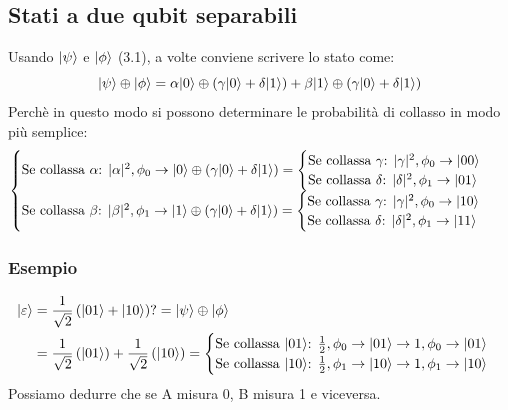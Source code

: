 \documentclass[12pt, a4paper]{report}
\begin{document}
\subsection{Stati a due qubit separabili}
Usando $| \psi \rangle$ e $| \phi \rangle$ (3.1), a volte conviene scrivere lo stato come:
\begin{equation*}
    | \psi \rangle\oplus| \phi \rangle = \alpha| 0 \rangle \oplus \left(\gamma| 0 \rangle+\delta| 1 \rangle\right) + \beta| 1 \rangle \oplus \left(\gamma| 0 \rangle+\delta| 1 \rangle\right)
\end{equation*}
Perchè in questo modo si possono determinare le probabilità di collasso in modo più semplice:
\begin{equation*}
    \begin{cases}
        \text{Se collassa $\alpha$: } |\alpha|^{2},\phi_{0} \rightarrow | 0 \rangle\oplus\left(\gamma| 0 \rangle+\delta| 1 \rangle\right) = \begin{cases}
            \text{Se collassa $\gamma$: } |\gamma|^{2},\phi_{0}\rightarrow | 00 \rangle\\
            \text{Se collassa $\delta$: } |\delta|^{2},\phi_{1}\rightarrow | 01 \rangle
        \end{cases}\\
        \text{Se collassa $\beta$: } |\beta|^{2},\phi_{1} \rightarrow | 1 \rangle\oplus\left(\gamma| 0 \rangle+\delta| 1 \rangle\right) = \begin{cases}
            \text{Se collassa $\gamma$: } |\gamma|^{2},\phi_{0}\rightarrow | 10 \rangle\\
            \text{Se collassa $\delta$: } |\delta|^{2},\phi_{1}\rightarrow | 11 \rangle
        \end{cases}\\
    \end{cases}
\end{equation*}
\subsubsection{Esempio}
\begin{equation*}
    \begin{split}
        | \varepsilon \rangle &= \frac{1}{\sqrt{2}}\left(| 01 \rangle+| 10 \rangle\right) ?= | \psi \rangle \oplus | \phi \rangle \\
        &= \frac{1}{\sqrt{2}}\left(| 01 \rangle\right) + \frac{1}{\sqrt{2}}\left(| 10 \rangle\right) = \begin{cases}
            \text{Se collassa $| 01 \rangle$: } \frac{1}{2}, \phi_{0} \rightarrow | 01 \rangle \rightarrow 1,\phi_{0} \rightarrow | 01 \rangle\\
            \text{Se collassa $| 10 \rangle$: } \frac{1}{2}, \phi_{1} \rightarrow | 10 \rangle \rightarrow 1,\phi_{1} \rightarrow | 10 \rangle
        \end{cases}
    \end{split}
\end{equation*}
Possiamo dedurre che se A misura 0, B misura 1 e viceversa.
\end{document}
